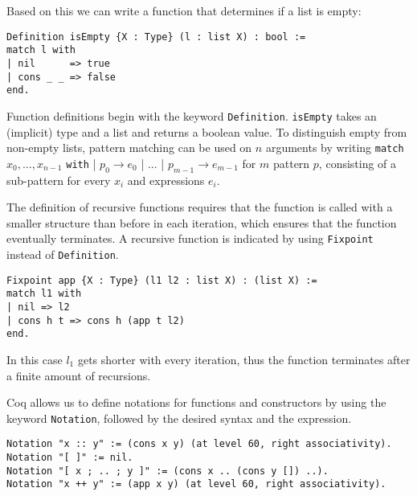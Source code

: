 \documentclass[fleqn]{scrreprt}
\newcommand{\coqinline}[1]{\texttt{#1}}
\begin{document}
Based on this we can write a function that determines if a list is empty:
\begin{verbatim}
Definition isEmpty {X : Type} (l : list X) : bool := 
match l with
| nil      => true
| cons _ _ => false
end.
\end{verbatim}
Function definitions begin with the keyword \coqinline{Definition}. \coqinline{isEmpty} takes an (implicit) type and a list and returns a boolean value.
To distinguish empty from non-empty lists, pattern matching can be used on $n$ arguments by writing \coqinline{match} $x_{0},...,x_{n-1}$ \coqinline{with} | $p_{0} \rightarrow e_{0}$ | ... | $p_{m-1} \rightarrow e_{m-1}$ for $m$ pattern $p$, consisting of a sub-pattern for every $x_{i}$ and expressions $e_{i}$.

The definition of recursive functions requires that the function is called with a smaller structure than before in each iteration, which ensures that the function eventually terminates. A recursive function is indicated by using \coqinline{Fixpoint} instead of \coqinline{Definition}.
\begin{verbatim}
Fixpoint app {X : Type} (l1 l2 : list X) : (list X) :=
match l1 with
| nil => l2
| cons h t => cons h (app t l2)
end.
\end{verbatim}
In this case $l_{1}$ gets shorter with every iteration, thus the function terminates after a finite amount of recursions. 

Coq allows us to define notations for functions and constructors by using the keyword \coqinline{Notation}, followed by the desired syntax and the expression. 
\begin{verbatim}
Notation "x :: y" := (cons x y) (at level 60, right associativity).
Notation "[ ]" := nil.
Notation "[ x ; .. ; y ]" := (cons x .. (cons y []) ..).
Notation "x ++ y" := (app x y) (at level 60, right associativity).
\end{verbatim}
\end{document}
